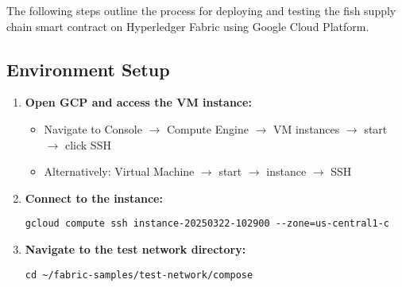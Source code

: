 The following steps outline the process for deploying and testing the fish supply chain smart contract on Hyperledger Fabric using Google Cloud Platform.

\subsection{Environment Setup}
\begin{enumerate}
	\item \textbf{Open GCP and access the VM instance:}
	\begin{itemize}
		\item Navigate to Console $\rightarrow$ Compute Engine $\rightarrow$ VM instances $\rightarrow$ start $\rightarrow$ click SSH
		\item Alternatively: Virtual Machine $\rightarrow$ start $\rightarrow$ instance $\rightarrow$ SSH
	\end{itemize}
	
	\item \textbf{Connect to the instance:}
	\begin{lstlisting}[style=appendixstyle, caption={Connect to GCP VM via \texttt{gcloud}}, label={lst:connect-gcp}]
		gcloud compute ssh instance-20250322-102900 --zone=us-central1-c
	\end{lstlisting}
	
	
	
	\item \textbf{Navigate to the test network directory:}
	\begin{lstlisting}[style=appendixstyle, caption={Navigate to Compose Directory}, label={lst:navigate-compose}]
		cd ~/fabric-samples/test-network/compose
	\end{lstlisting}
\end{enumerate}

